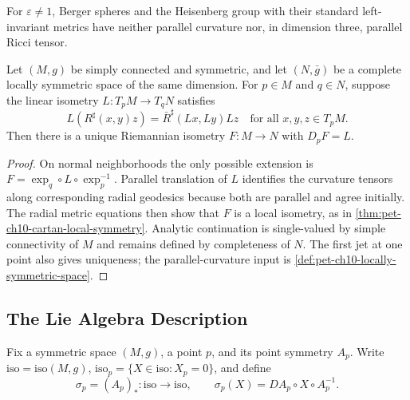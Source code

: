 \begin{remark}
  \label{rem:pet-ch10-non-locally-symmetric-examples}
  For $\varepsilon\ne1$, Berger spheres and the Heisenberg group with their
  standard left-invariant metrics have neither parallel curvature nor, in
  dimension three, parallel Ricci tensor.
\end{remark}

\begin{theorem}
  \label{thm:pet-ch10-cartan-isometry-extension}
  Let $(M,g)$ be simply connected and symmetric, and let $(N,\bar g)$ be a
  complete locally symmetric space of the same dimension. For $p\in M$ and
  $q\in N$, suppose the linear isometry $L:T_pM\to T_qN$ satisfies
  \[
    L(R^\sharp(x,y)z)=\bar R^\sharp(Lx,Ly)Lz
    \quad\text{for all }x,y,z\in T_pM.
  \]
  Then there is a unique Riemannian isometry $F:M\to N$ with $D_pF=L$.
\end{theorem}
\begin{proof}
  \sketch
  On normal neighborhoods the only possible extension is
  $F=\exp_q\circ L\circ\exp_p^{-1}$. Parallel translation of $L$ identifies the
  curvature tensors along corresponding radial geodesics because both are
  parallel and agree initially. The radial metric equations then show that
  $F$ is a local isometry, as in
  \cref{thm:pet-ch10-cartan-local-symmetry}. Analytic continuation is
  single-valued by simple connectivity of $M$ and remains defined by
  completeness of $N$. The first jet at one point also gives uniqueness; the
  parallel-curvature input is \cref{def:pet-ch10-locally-symmetric-space}.
\end{proof}

\subsection{The Lie Algebra Description}

Fix a symmetric space $(M,g)$, a point $p$, and its point symmetry $A_p$. Write
$\mathrm{iso}=\mathrm{iso}(M,g)$,
$\mathrm{iso}_p=\{X\in\mathrm{iso}:X_p=0\}$, and define
\[
  \sigma_p=(A_p)_*:\mathrm{iso}\longrightarrow\mathrm{iso},\qquad
  \sigma_p(X)=DA_p\circ X\circ A_p^{-1}.
\]


